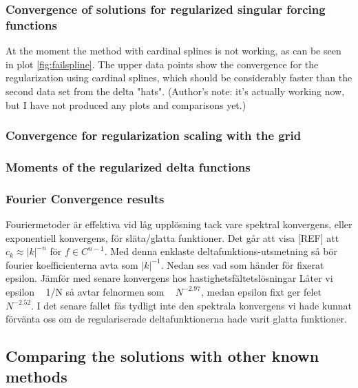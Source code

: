 \documentclass[a4paper,twoside=false,abstract=false,numbers=noenddot,
titlepage=false,headings=small,parskip=half,version=last]{scrartcl}
\begin{document}
\subsubsection{Convergence of solutions for regularized singular forcing functions}

At the moment the method with cardinal splines is not working, as can be seen in plot \ref{fig:failspline}. The upper data points show the convergence for the regularization using cardinal splines, which should be considerably faster than the second data set from the delta "hats". (Author's note: it's actually working now, but I have not produced any plots and comparisons yet.)

\subsubsection{Convergence for regularization scaling with the grid}
\subsubsection{Moments of the regularized delta functions}
\subsubsection{Fourier Convergence results}
Fouriermetoder är effektiva vid låg upplösning tack vare spektral konvergens, eller exponentiell konvergens, för släta/glatta funktioner. Det går att visa [REF] att $c_k \approx |k|^{-n}$ för $f \in C^{n-1}$.
Med denna enklaste deltafunktions-utsmetning så bör fourier koefficienterna avta som $|k|^{-1}$.
Nedan ses vad som händer för fixerat epsilon. Jämför med senare 
konvergens hos hastighetsfältetslösningar
Låter vi epsilon ~ 1/N så avtar felnormen som ~ $N^{-2.97}$, medan epsilon fixt ger felet ~ $N^{-2.52}$. I det senare fallet fås tydligt inte den spektrala konvergens vi hade kunnat förvänta oss om de regulariserade deltafunktionerna hade varit glatta funktioner.
\subsection{Comparing the solutions with other known methods}
\end{document}
